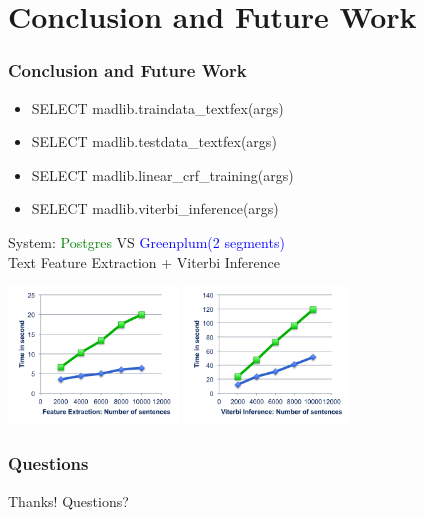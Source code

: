 \documentclass{beamer}
\begin{document}
\section{Conclusion and Future Work}

\begin{frame}
  \frametitle{Conclusion and Future Work}

  \begin{itemize}
    \item SELECT madlib.traindata\_textfex(args)
    \item SELECT madlib.testdata\_textfex(args)
    \item SELECT madlib.linear\_crf\_training(args)
    \item SELECT madlib.viterbi\_inference(args)
  \end{itemize}
  \begin{center}System: \textcolor{green}{Postgres} VS \textcolor{blue}{Greenplum(2 segments)}\\
	  Text Feature Extraction + Viterbi Inference\end{center}
  \begin{center}
	  \includegraphics[height=9.9em]{extraction.png}
	  \includegraphics[height=9.9em]{viterbi.png}
  \end{center}
\end{frame}

\begin{frame}
  \frametitle{Questions}
  \begin{center}
   Thanks! Questions?
  \end{center}
\end{frame}
\end{document}
